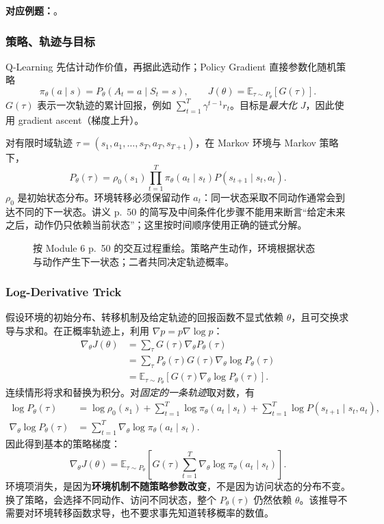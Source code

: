 \textbf{对应例题：}。


\subsubsection*{策略、轨迹与目标}

Q-Learning 先估计动作价值，再据此选动作；Policy Gradient 直接参数化随机策略
\[
  \pi_\theta(a\mid s)=P_\theta(A_t=a\mid S_t=s),
  \qquad J(\theta)=\mathbb E_{\tau\sim P_\theta}[G(\tau)].
\]
$G(\tau)$ 表示一次轨迹的累计回报，例如 $\sum_{t=1}^{T}\gamma^{t-1}r_t$。目标是\emph{最大化} $J$，因此使用 gradient ascent（梯度上升）。

对有限时域轨迹 $\tau=(s_1,a_1,\ldots,s_T,a_T,s_{T+1})$，在 Markov 环境与 Markov 策略下，
\[
  \boxed{P_\theta(\tau)=\rho_0(s_1)
    \prod_{t=1}^{T}\pi_\theta(a_t\mid s_t)
    P(s_{t+1}\mid s_t,a_t)}.
\]
$\rho_0$ 是初始状态分布。环境转移必须保留动作 $a_t$：同一状态采取不同动作通常会到达不同的下一状态。讲义 p.~50 的简写及中间条件化步骤不能用来断言“给定未来之后，动作仍只依赖当前状态”；这里按时间顺序使用正确的链式分解。

\begin{figure}[htbp]
  \centering
  
  \caption{按 Module 6 p.~50 的交互过程重绘。策略产生动作，环境根据状态与动作产生下一状态；二者共同决定轨迹概率。}
  \label{fig:sc3000-l06-trajectory}
\end{figure}

\subsubsection*{Log-Derivative Trick}

假设环境的初始分布、转移机制及给定轨迹的回报函数不显式依赖 $\theta$，且可交换求导与求和。在正概率轨迹上，利用 $\nabla p=p\nabla\log p$：
\begin{align*}
  \nabla_\theta J(\theta)
  &=\sum_\tau G(\tau)\nabla_\theta P_\theta(\tau)\\
  &=\sum_\tau P_\theta(\tau)G(\tau)\nabla_\theta\log P_\theta(\tau)\\
  &=\mathbb E_{\tau\sim P_\theta}
      [G(\tau)\nabla_\theta\log P_\theta(\tau)].
\end{align*}
连续情形将求和替换为积分。对\emph{固定的一条轨迹}取对数，有
\begin{align*}
  \log P_\theta(\tau)
  &=\log\rho_0(s_1)+\sum_{t=1}^{T}\log\pi_\theta(a_t\mid s_t)
    +\sum_{t=1}^{T}\log P(s_{t+1}\mid s_t,a_t),\\
  \nabla_\theta\log P_\theta(\tau)
  &=\sum_{t=1}^{T}\nabla_\theta\log\pi_\theta(a_t\mid s_t).
\end{align*}
因此得到基本的策略梯度：
\[
  \boxed{\nabla_\theta J(\theta)=
    \mathbb E_{\tau\sim P_\theta}\!\left[
      G(\tau)\sum_{t=1}^{T}\nabla_\theta\log\pi_\theta(a_t\mid s_t)
    \right]}.
\]
环境项消失，是因为\textbf{环境机制不随策略参数改变}，不是因为访问状态的分布不变。换了策略，会选择不同动作、访问不同状态，整个 $P_\theta(\tau)$ 仍然依赖 $\theta$。该推导不需要对环境转移函数求导，也不要求事先知道转移概率的数值。

